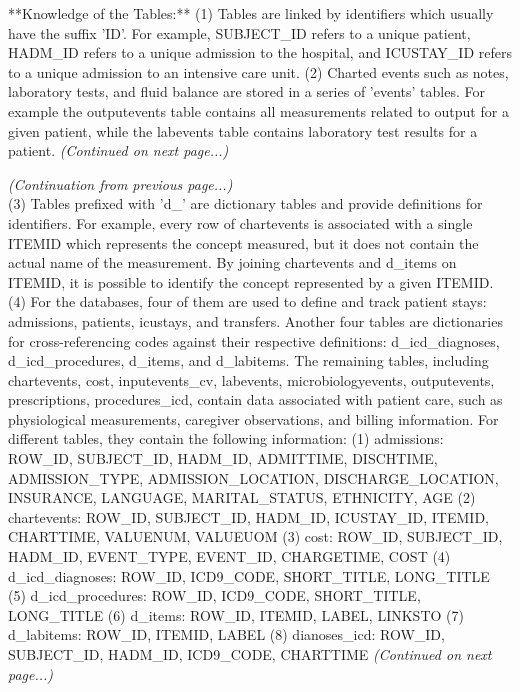 \documentclass[11pt]{article}
\theoremstyle{plain}
\theoremstyle{definition}
\begin{document}
{\begin{tcolorbox}[systembox]
**Knowledge of the Tables:**
(1) Tables are linked by identifiers which usually have the suffix 'ID'. For example, SUBJECT\_ID refers to a unique patient, HADM\_ID refers to a unique admission to the hospital, and ICUSTAY\_ID refers to a unique admission to an intensive care unit.
(2) Charted events such as notes, laboratory tests, and fluid balance are stored in a series of 'events' tables. For example the outputevents table contains all measurements related to output for a given patient, while the labevents table contains laboratory test results for a patient.
\textit{(Continued on next page...)}
\end{tcolorbox}

\begin{tcolorbox}[systembox]
\textit{(Continuation from previous page...)}\\
(3) Tables prefixed with 'd\_' are dictionary tables and provide definitions for identifiers. For example, every row of chartevents is associated with a single ITEMID which represents the concept measured, but it does not contain the actual name of the measurement. By joining chartevents and d\_items on ITEMID, it is possible to identify the concept represented by a given ITEMID.\\
(4) For the databases, four of them are used to define and track patient stays: admissions, patients, icustays, and transfers. Another four tables are dictionaries for cross-referencing codes against their respective definitions: d\_icd\_diagnoses, d\_icd\_procedures, d\_items, and d\_labitems. The remaining tables, including chartevents, cost, inputevents\_cv, labevents, microbiologyevents, outputevents, prescriptions, procedures\_icd, contain data associated with patient care, such as physiological measurements, caregiver observations, and billing information.
For different tables, they contain the following information:
(1) admissions: ROW\_ID, SUBJECT\_ID, HADM\_ID, ADMITTIME, DISCHTIME, ADMISSION\_TYPE, ADMISSION\_LOCATION, DISCHARGE\_LOCATION, INSURANCE, LANGUAGE, MARITAL\_STATUS, ETHNICITY, AGE
(2) chartevents: ROW\_ID, SUBJECT\_ID, HADM\_ID, ICUSTAY\_ID, ITEMID, CHARTTIME, VALUENUM, VALUEUOM
(3) cost: ROW\_ID, SUBJECT\_ID, HADM\_ID, EVENT\_TYPE, EVENT\_ID, CHARGETIME, COST
(4) d\_icd\_diagnoses: ROW\_ID, ICD9\_CODE, SHORT\_TITLE, LONG\_TITLE
(5) d\_icd\_procedures: ROW\_ID, ICD9\_CODE, SHORT\_TITLE, LONG\_TITLE
(6) d\_items: ROW\_ID, ITEMID, LABEL, LINKSTO
(7) d\_labitems: ROW\_ID, ITEMID, LABEL
(8) dianoses\_icd: ROW\_ID, SUBJECT\_ID, HADM\_ID, ICD9\_CODE, CHARTTIME
\textit{(Continued on next page...)}
\end{tcolorbox}

}
\end{document}
